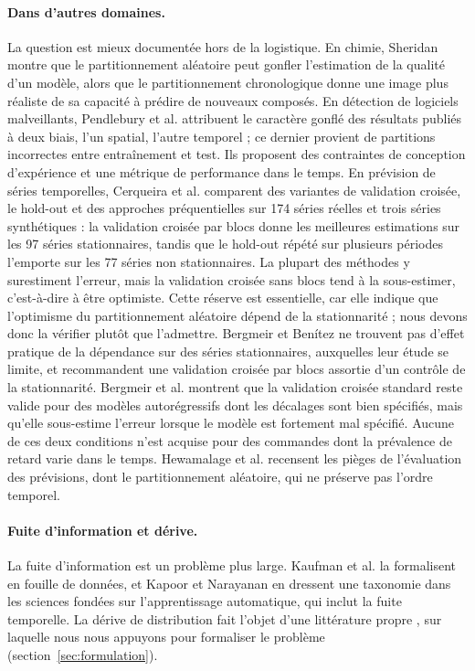 \documentclass[11pt,a4paper]{article}
\theoremstyle{definition}
\begin{document}
\paragraph{Dans d'autres domaines.} La question est mieux documentée hors de la logistique. En chimie, Sheridan \cite{sheridan2013time} montre que le partitionnement aléatoire peut gonfler l'estimation de la qualité d'un modèle, alors que le partitionnement chronologique donne une image plus réaliste de sa capacité à prédire de nouveaux composés. En détection de logiciels malveillants, Pendlebury et al. \cite{pendlebury2019tesseract} attribuent le caractère gonflé des résultats publiés à deux biais, l'un spatial, l'autre temporel ; ce dernier provient de partitions incorrectes entre entraînement et test. Ils proposent des contraintes de conception d'expérience et une métrique de performance dans le temps. En prévision de séries temporelles, Cerqueira et al. \cite{cerqueira2020evaluating} comparent des variantes de validation croisée, le hold-out et des approches préquentielles sur 174 séries réelles et trois séries synthétiques : la validation croisée par blocs donne les meilleures estimations sur les 97 séries stationnaires, tandis que le hold-out répété sur plusieurs périodes l'emporte sur les 77 séries non stationnaires. La plupart des méthodes y surestiment l'erreur, mais la validation croisée sans blocs tend à la sous-estimer, c'est-à-dire à être optimiste. Cette réserve est essentielle, car elle indique que l'optimisme du partitionnement aléatoire dépend de la stationnarité ; nous devons donc la vérifier plutôt que l'admettre. Bergmeir et Benítez \cite{bergmeir2012use} ne trouvent pas d'effet pratique de la dépendance sur des séries stationnaires, auxquelles leur étude se limite, et recommandent une validation croisée par blocs assortie d'un contrôle de la stationnarité. Bergmeir et al. \cite{bergmeir2018note} montrent que la validation croisée standard reste valide pour des modèles autorégressifs dont les décalages sont bien spécifiés, mais qu'elle sous-estime l'erreur lorsque le modèle est fortement mal spécifié. Aucune de ces deux conditions n'est acquise pour des commandes dont la prévalence de retard varie dans le temps. Hewamalage et al. \cite{hewamalage2023forecast} recensent les pièges de l'évaluation des prévisions, dont le partitionnement aléatoire, qui ne préserve pas l'ordre temporel.

\paragraph{Fuite d'information et dérive.} La fuite d'information est un problème plus large. Kaufman et al. \cite{kaufman2012leakage} la formalisent en fouille de données, et Kapoor et Narayanan \cite{kapoor2023leakage} en dressent une taxonomie dans les sciences fondées sur l'apprentissage automatique, qui inclut la fuite temporelle. La dérive de distribution fait l'objet d'une littérature propre \cite{gama2014survey,morenotorres2012unifying}, sur laquelle nous nous appuyons pour formaliser le problème (section~\ref{sec:formulation}).
\end{document}
